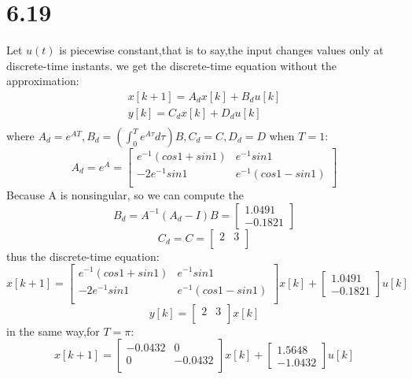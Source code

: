 \documentclass{article}
\begin{document}
\section*{6.19}
Let $u(t)$ is piecewise constant,that is to say,the input changes values only at discrete-time instants.
we get the discrete-time equation without the approximation:
\[
\begin{aligned}
x[k+1]=A_dx[k]+B_du[k]\\
y[k]=C_dx[k]+D_du[k]\\
\end{aligned}    
\]
where $A_d=e^{AT},B_d=(\int_{0}^{T}e^{A\tau}d\tau)B,C_d=C,D_d=D$
when $T=1$:
\[
A_d=e^{A}=
\left[
\begin{array}{cc}
e^{-1}(cos1+sin1) & e^{-1}sin1 \\
-2e^{-1}sin1 & e^{-1}(cos1-sin1)\\
\end{array}
\right]
\]
Because A is nonsingular, so we can compute the
\[
B_d=A^{-1}(A_d-I)B=
\left[
\begin{array}{c}
1.0491\\
-0.1821
\end{array}
\right]    
\]
\[
C_d=C=
\left[
\begin{array}{cc}
2 &3\\
\end{array}
\right] 
\]
thus the discrete-time equation:
\[
x[k+1]=
\left[
\begin{array}{cc}
e^{-1}(cos1+sin1) & e^{-1}sin1 \\
-2e^{-1}sin1 & e^{-1}(cos1-sin1)\\
\end{array}
\right]x[k]+
\left[
\begin{array}{c}
1.0491\\
-0.1821
\end{array}
\right]u[k]
\]
\[
y[k]=
\left[
\begin{array}{cc}
2 &3\\
\end{array}
\right]x[k]
\]
in the same way,for $T=\pi$:
\[
x[k+1]=
\left[
\begin{array}{cc}
-0.0432 & 0 \\
0 & -0.0432\\
\end{array}
\right]x[k]+
\left[
\begin{array}{c}
1.5648\\
-1.0432
\end{array}
\right]u[k]
\]
\end{document}
